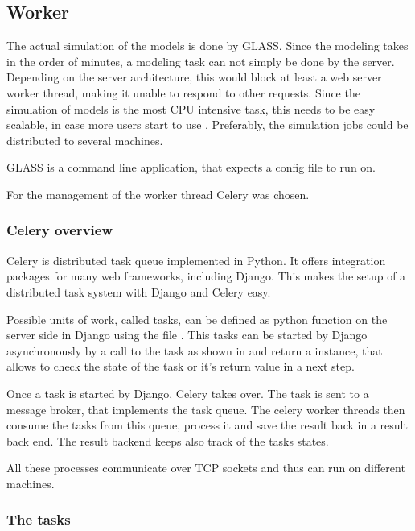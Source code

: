 \subsection{Worker}
\label{sec:worker}

The actual simulation of the models is done by GLASS.
Since the modeling takes in the order of minutes, a modeling task can not simply be done by the server.
Depending on the server architecture, this would block at least a web server worker thread, making it unable to respond to other requests.
Since the simulation of models is the most CPU intensive task, this needs to be easy scalable, in case more users start to use \spl. 
Preferably, the simulation jobs could be distributed to several machines.

GLASS is a command line application, that expects a config file to run on.

For the management of the worker thread Celery was chosen.


\subsubsection{Celery overview}
Celery is distributed task queue implemented in Python.
It offers integration packages for many web frameworks, including Django.
This makes the setup of a distributed task system with Django and Celery easy.


Possible units of work, called tasks, can be defined as python function on the server side in Django using the file .
This tasks can be started by Django asynchronously by a call to the task as shown in  and return a  instance, that allows to check the state of the task or it's return value in a next step.

Once a task is started by Django, Celery takes over.
The task is sent to a message broker, that implements the task queue.
The celery worker threads then consume the tasks from this queue, process it and save the result back in a result back end. The result backend keeps also track of the tasks states.

All these processes communicate over TCP sockets and thus can run on different machines.

\subsubsection{The tasks}

